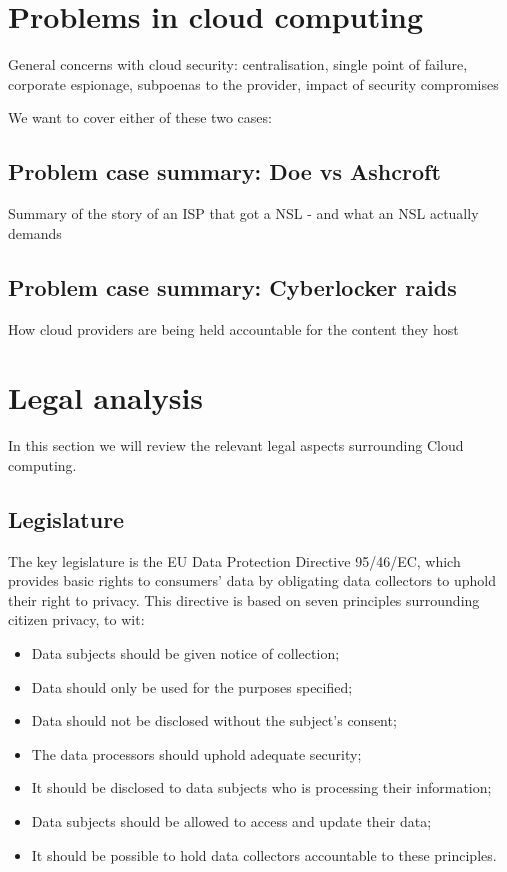 \documentclass[11pt]{article}
\begin{document}
\section{Problems in cloud computing}
General concerns with cloud security: centralisation, single point of failure, corporate espionage, subpoenas to the provider, impact of security compromises
\cite{chow2009controlling}

We want to cover either of these two cases:

\subsection{Problem case summary: Doe vs Ashcroft}
Summary of the story of an ISP that got a NSL - and what an NSL actually demands
\cite{garlinger2009privacy, gorham2008national}

\subsection{Problem case summary: Cyberlocker raids}
How cloud providers are being held accountable for the content they host

\section{Legal analysis}
In this section we will review the relevant legal aspects surrounding Cloud computing.

\subsection{Legislature}
The key legislature is the EU Data Protection Directive 95/46/EC, which provides basic rights to consumers' data by obligating data collectors to uphold their right to privacy. \cite{directive199595}
This directive is based on seven principles surrounding citizen privacy, to wit:
\begin{itemize}
\item Data subjects should be given notice of collection;
\item Data should only be used for the purposes specified;
\item Data should not be disclosed without the subject's consent;
\item The data processors should uphold adequate security;
\item It should be disclosed to data subjects who is processing their information;
\item Data subjects should be allowed to access and update their data;
\item It should be possible to hold data collectors accountable to these principles.
\end{itemize}
\end{document}
